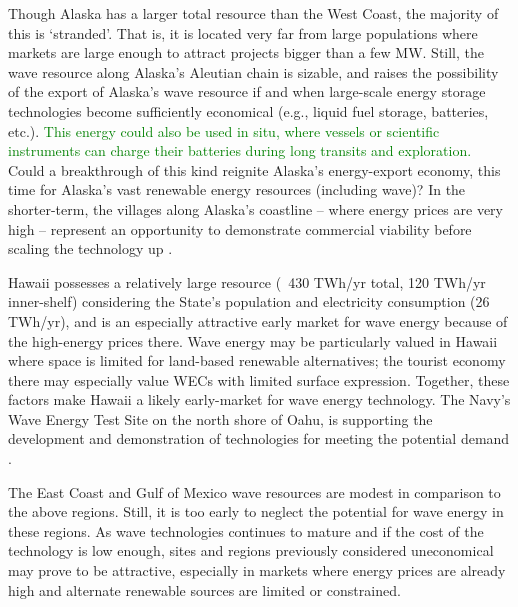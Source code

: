 Though Alaska has a larger total resource than the West Coast, the majority of this is `stranded'. That is, it is located very far from large populations where markets are large enough to attract projects bigger than a few MW. Still, the wave resource along Alaska's Aleutian chain is sizable, and raises the possibility of the export of Alaska's wave resource if and when large-scale energy storage technologies become sufficiently economical (e.g., liquid fuel storage, batteries, etc.). \textcolor{green}{This energy could also be used in situ, where vessels or scientific instruments can charge their batteries during long transits and exploration.} Could a breakthrough of this kind reignite Alaska's energy-export economy, this time for Alaska's vast renewable energy resources (including wave)? In the shorter-term, the villages along Alaska's coastline -- where energy prices are very high -- represent an opportunity to demonstrate commercial viability before scaling the technology up \cite{alaskaenergyauthority2019PowerCost2020}.

Hawaii possesses a relatively large resource (~430 TWh/yr total, 120 TWh/yr inner-shelf) considering the State's population and electricity consumption (26 TWh/yr), and is an especially attractive early market for wave energy because of the high-energy prices there. 
Wave energy may be particularly valued in Hawaii where space is limited for land-based renewable alternatives; the tourist economy there may especially value WECs with limited surface expression. Together, these factors make Hawaii a likely early-market for wave energy technology. The Navy's Wave Energy Test Site on the north shore of Oahu, is supporting the development and demonstration of technologies for meeting the potential demand \citep{crossEarlyResearchEfforts2015}.

The East Coast and Gulf of Mexico wave resources are modest in comparison to the above regions. Still, it is too early to neglect the potential for wave energy in these regions. As wave technologies continues to mature and if the cost of the technology is low enough, sites and regions previously considered uneconomical may prove to be attractive, especially in markets where energy prices are already high and alternate renewable sources are limited or constrained. 

